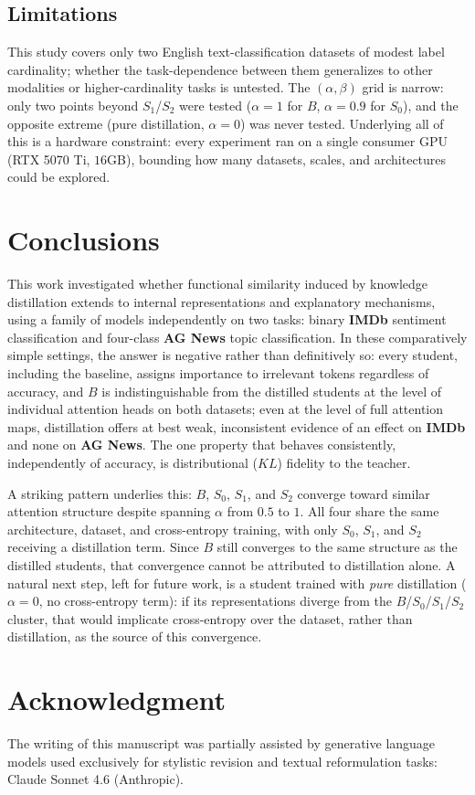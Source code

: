 \documentclass[conference]{IEEEtran}
\begin{document}
\subsection{Limitations}\label{sec:limitations}

This study covers only two English text-classification datasets of modest label cardinality; whether the task-dependence between them generalizes to other modalities or higher-cardinality tasks is untested. The $(\alpha,\beta)$ grid is narrow: only two points beyond $S_1$/$S_2$ were tested ($\alpha=1$ for $B$, $\alpha=0.9$ for $S_0$), and the opposite extreme (pure distillation, $\alpha=0$) was never tested. Underlying all of this is a hardware constraint: every experiment ran on a single consumer GPU (RTX 5070 Ti, $16$GB), bounding how many datasets, scales, and architectures could be explored.

\section{Conclusions}

This work investigated whether functional similarity induced by knowledge distillation extends to internal representations and explanatory mechanisms, using a family of models independently on two tasks: binary \textbf{IMDb} sentiment classification and four-class \textbf{AG News} topic classification. In these comparatively simple settings, the answer is negative rather than definitively so: every student, including the baseline, assigns importance to irrelevant tokens regardless of accuracy, and $B$ is indistinguishable from the distilled students at the level of individual attention heads on both datasets; even at the level of full attention maps, distillation offers at best weak, inconsistent evidence of an effect on \textbf{IMDb} and none on \textbf{AG News}. The one property that behaves consistently, independently of accuracy, is distributional ($KL$) fidelity to the teacher.

A striking pattern underlies this: $B$, $S_0$, $S_1$, and $S_2$ converge toward similar attention structure despite spanning $\alpha$ from $0.5$ to $1$. All four share the same architecture, dataset, and cross-entropy training, with only $S_0$, $S_1$, and $S_2$ receiving a distillation term. Since $B$ still converges to the same structure as the distilled students, that convergence cannot be attributed to distillation alone. A natural next step, left for future work, is a student trained with \emph{pure} distillation ($\alpha=0$, no cross-entropy term): if its representations diverge from the $B$/$S_0$/$S_1$/$S_2$ cluster, that would implicate cross-entropy over the dataset, rather than distillation, as the source of this convergence.

\section*{Acknowledgment}

The writing of this manuscript was partially assisted by generative language models used exclusively for stylistic revision and textual reformulation tasks: Claude Sonnet 4.6 \cite{anthropic2025claude} (Anthropic).



\end{document}
